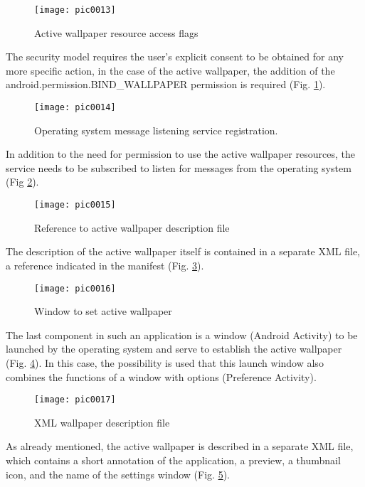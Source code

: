 \begin{figure}[h]
\centering
\texttt{[image: pic0013]}
\caption{Active wallpaper resource access flags}
\label{fig:pic0013}
\end{figure}
\FloatBarrier

The security model requires the user's explicit consent to be obtained for any more specific action, in the case of the active wallpaper, the addition of the android.permission.BIND\_WALLPAPER permission is required (Fig. \ref{fig:pic0013}).

\begin{figure}[h]
\centering
\texttt{[image: pic0014]}
\caption{Operating system message listening service registration.}
\label{fig:pic0014}
\end{figure}
\FloatBarrier

In addition to the need for permission to use the active wallpaper resources, the service needs to be subscribed to listen for messages from the operating system (Fig \ref{fig:pic0014}).

\begin{figure}[h]
\centering
\texttt{[image: pic0015]}
\caption{Reference to active wallpaper description file}
\label{fig:pic0015}
\end{figure}
\FloatBarrier

The description of the active wallpaper itself is contained in a separate XML file, a reference indicated in the manifest (Fig. \ref{fig:pic0015}).

\begin{figure}[h]
\centering
\texttt{[image: pic0016]}
\caption{Window to set active wallpaper}
\label{fig:pic0016}
\end{figure}
\FloatBarrier

The last component in such an application is a window (Android Activity) to be launched by the operating system and serve to establish the active wallpaper (Fig. \ref{fig:pic0016}). In this case, the possibility is used that this launch window also combines the functions of a window with options (Preference Activity).

\begin{figure}[h]
\centering
\texttt{[image: pic0017]}
\caption{XML wallpaper description file}
\label{fig:pic0017}
\end{figure}
\FloatBarrier

As already mentioned, the active wallpaper is described in a separate XML file, which contains a short annotation of the application, a preview, a thumbnail icon, and the name of the settings window (Fig. \ref{fig:pic0017}).

